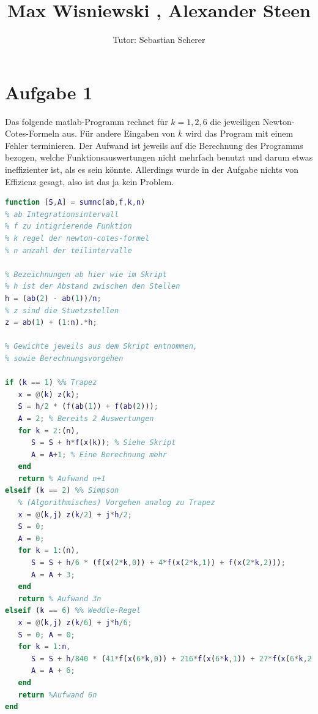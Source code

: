 \documentclass[11pt,a4paper,ngerman]{article}
\author{Tutor: Sebastian Scherer}
\date{}
\title{Max Wisniewski , Alexander Steen}
\begin{document}

\maketitle
\thispagestyle{fancy}



\section*{Aufgabe 1}
Das folgende matlab-Programm rechnet für $k= 1,2,6$ die jeweiligen Newton-Cotes-Formeln aus. Für andere Eingaben von $k$ wird das Program mit einem Fehler terminieren. Der Aufwand ist jeweils auf die Berechnung des Programms bezogen, welche Funktionsauswertungen nicht mehrfach benutzt und darum etwas ineffizienter ist, als es sein könnte. Allerdings wurde in der Aufgabe nichts von Effizienz gesagt, also ist das ja kein Problem.

\begin{lstlisting}[language=matlab]
function [S,A] = sumnc(ab,f,k,n)
% ab Integrationsintervall
% f zu intigrierende Funktion
% k regel der newton-cotes-formel
% n anzahl der teilintervalle

% Bezeichnungen ab hier wie im Skript
% h ist der Abstand zwischen den Stellen
h = (ab(2) - ab(1))/n;
% z sind die Stuetzstellen
z = ab(1) + (1:n).*h;

% Gewichte jeweils aus dem Skript entnommen,
% sowie Berechnungsvorgehen

if (k == 1) %% Trapez
   x = @(k) z(k);
   S = h/2 * (f(ab(1)) + f(ab(2)));
   A = 2; % Bereits 2 Auswertungen
   for k = 2:(n),
      S = S + h*f(x(k)); % Siehe Skript
      A = A+1; % Eine Berechnung mehr
   end
   return % Aufwand n+1
elseif (k == 2) %% Simpson
   % (Algorithmisches) Vorgehen analog zu Trapez
   x = @(k,j) z(k/2) + j*h/2;
   S = 0;
   A = 0;
   for k = 1:(n),
      S = S + h/6 * (f(x(2*k,0)) + 4*f(x(2*k,1)) + f(x(2*k,2)));
      A = A + 3;
   end
   return % Aufwand 3n
elseif (k == 6) %% Weddle-Regel
   x = @(k,j) z(k/6) + j*h/6;
   S = 0; A = 0;
   for k = 1:n,
      S = S + h/840 * (41*f(x(6*k,0)) + 216*f(x(6*k,1)) + 27*f(x(6*k,2)) + 272*f(x(6*k,3)) + 27*f(x(6*k,4)) + 216*f(x(6*k,5)) + 41*f(x(6*k,6)));
      A = A + 6;
   end
   return %Aufwand 6n
end
\end{lstlisting}
\end{document}
